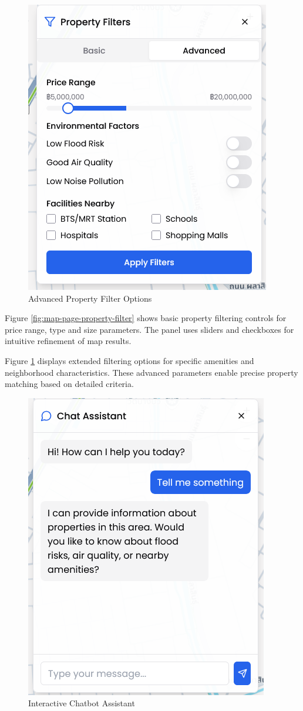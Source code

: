 \begin{figure}[h]
\begin{minipage}[b]{0.45\textwidth}
\includegraphics[width=\textwidth]{assets/ui/map-page-property-filter-advance.png}
\caption{Advanced Property Filter Options}
\label{fig:map-page-property-filter-advance}
\end{minipage}
\end{figure}

\pagebreak
Figure \ref{fig:map-page-property-filter} shows basic property filtering controls for price range, type and size parameters. The panel uses sliders and checkboxes for intuitive refinement of map results.

Figure \ref{fig:map-page-property-filter-advance} displays extended filtering options for specific amenities and neighborhood characteristics. These advanced parameters enable precise property matching based on detailed criteria.

\begin{figure}[h]
\centering
\includegraphics[height=0.5\textwidth]{assets/ui/map-page-chatbot.png}
\caption{Interactive Chatbot Assistant}
\label{fig:map-page-chatbot}
\end{figure}


